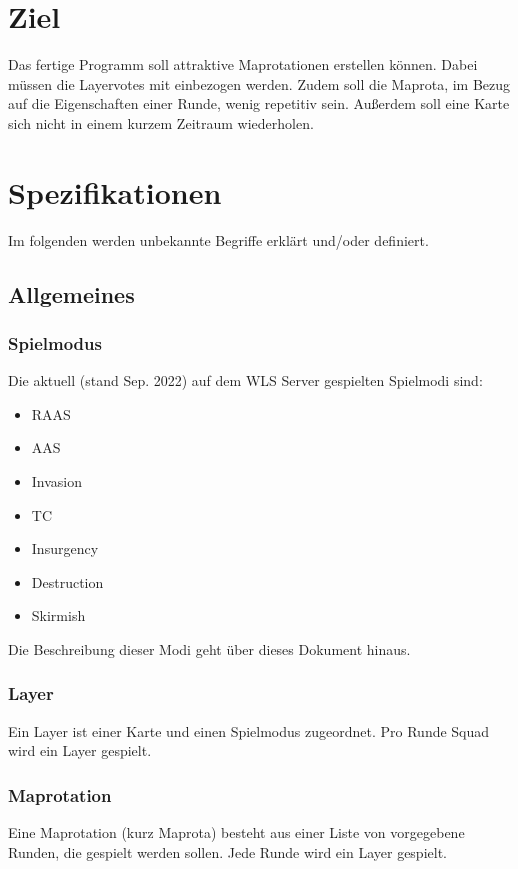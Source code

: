 \documentclass[a4paper, 11pt]{scrartcl}
\begin{document}
    \section{Ziel}
        Das fertige Programm soll attraktive Maprotationen erstellen können.
        Dabei müssen die Layervotes mit einbezogen werden. Zudem soll die Maprota, im Bezug auf die Eigenschaften einer Runde, wenig repetitiv sein.
        Außerdem soll eine Karte sich nicht in einem kurzem Zeitraum wiederholen.

    \section{Spezifikationen}
    Im folgenden werden unbekannte Begriffe erklärt und/oder definiert.
        \subsection{Allgemeines}
            \subsubsection{Spielmodus}
                Die aktuell (stand Sep. 2022) auf dem {WLS} Server gespielten Spielmodi sind:\\
                \begin{itemize}
                    \item RAAS
                    \item AAS
                    \item Invasion
                    \item TC
                    \item Insurgency
                    \item Destruction
                    \item Skirmish
                \end{itemize}
                Die Beschreibung dieser Modi geht über dieses Dokument hinaus.
            \subsubsection{Layer}
                Ein Layer ist einer Karte und einen Spielmodus zugeordnet.
                Pro Runde Squad wird ein Layer gespielt. 
            \subsubsection{Maprotation}
                Eine Maprotation (kurz Maprota) besteht aus einer Liste von vorgegebene Runden, die gespielt werden sollen.
                Jede Runde wird ein Layer gespielt.
\end{document}

